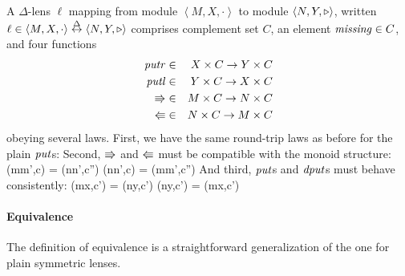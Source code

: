 \begin{defn}[$R$-similarity]
\begin{theorem}
\begin{lemma}
\begin{theorem}[No products]
\begin{lemma}
\begin{defn}
\begin{theorem}
\begin{corollary}[Hylomorphism]
\begin{defn}
\begin{defn}[Symmetrization]
\begin{theorem}
\begin{defn}
A $\Delta$-lens $\ell$ mapping from module
        $\left<M,X,\cdot\right>$ to module $\left<N,Y,\triangleright\right>$, 
        written $\ell \in \left<M,X,\cdot\right> \overset{\Delta}{\leftrightarrow}
        \left<N,Y,\triangleright\right>$ comprises complement set
        $C$, an element 
        $\mathit{missing} \in C$, and four functions
        \begin{eqnarray*}
            \mathit{putr}  &\in& X \times C \to Y \times C \\
            \mathit{putl}  &\in& Y \times C \to X \times C \\
            \mathord{\Rrightarrow} &\in& M \times C \to N \times C \\
            \mathord{\Lleftarrow} &\in& N \times C \to M \times C
        \end{eqnarray*}
obeying several laws.  
%
First, we have the same round-trip laws as before for the plain $\mathit{put}$s:
%
%
Second, $\mathord{\Rrightarrow}$ and $\mathord{\Lleftarrow}$ must be compatible with the monoid structure:
%
    {\dputr(mm',c) = (nn',c'')}
    {\dputl(nn',c) = (mm',c'')}
%
And third, $\mathit{put}$s and $\mathit{dput}$s must behave consistently:
        {\putr(mx,c') = (ny,c')}
        {\putl(ny,c') = (mx,c')}
\end{defn}


\paragraph*{Equivalence} The definition of equivalence is a straightforward
generalization of the one for plain symmetric lenses.


\end{theorem}
\end{defn}
\end{defn}
\end{corollary}
\end{theorem}
\end{defn}
\end{lemma}
\end{theorem}
\end{lemma}
\end{theorem}
\end{defn}
